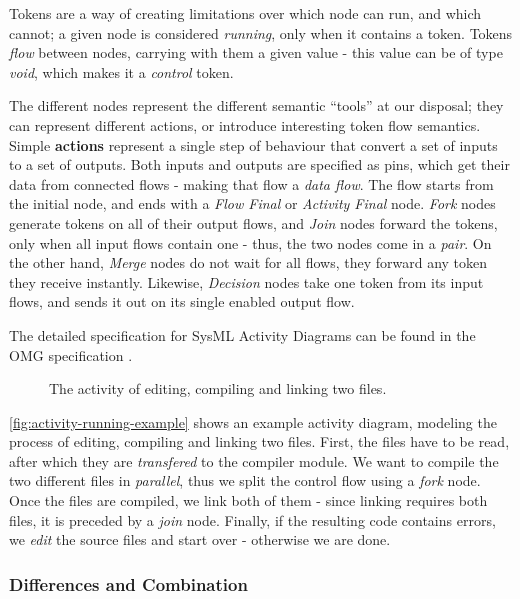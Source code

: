 Tokens are a way of creating limitations over which node can run, and which cannot; a given node is considered \emph{running}, only when it contains a token. Tokens \emph{flow} between nodes, carrying with them a given value - this value can be of type \emph{void}, which makes it a \emph{control} token.

The different nodes represent the different semantic \enquote{tools} at our disposal; they can represent different actions, or introduce interesting token flow semantics.
Simple \textbf{actions} represent a single step of behaviour that convert a set of inputs to a set of outputs. Both inputs and outputs are specified as pins, which get their data from connected flows - making that flow a \emph{data flow}. The flow starts from the initial node, and ends with a \emph{Flow Final} or \emph{Activity Final} node. \emph{Fork} nodes generate tokens on all of their output flows, and \emph{Join} nodes forward the tokens, only when all input flows contain one - thus, the two nodes come in a \emph{pair}. On the other hand, \emph{Merge} nodes do not wait for all flows, they forward any token they receive instantly. Likewise, \emph{Decision} nodes take one token from its input flows, and sends it out on its single enabled output flow.

The detailed specification for SysML Activity Diagrams can be found in the OMG specification \cite{omg_sysml}.

\begin{figure}[!ht]
	\centering
	
	\caption{The activity of editing, compiling and linking two files.}
	\label{fig:activity-running-example}
\end{figure}

\autoref{fig:activity-running-example} shows an example activity diagram, modeling the process of editing, compiling and linking two files. First, the files have to be read, after which they are \emph{transfered} to the compiler module. We want to compile the two different files in \emph{parallel}, thus we split the control flow using a \emph{fork} node. Once the files are compiled, we link both of them - since linking requires both files, it is preceded by a \emph{join} node. Finally, if the resulting code contains errors, we \emph{edit} the source files and start over - otherwise we are done.

\iffalse
\subsubsection{Differences and Combination}

